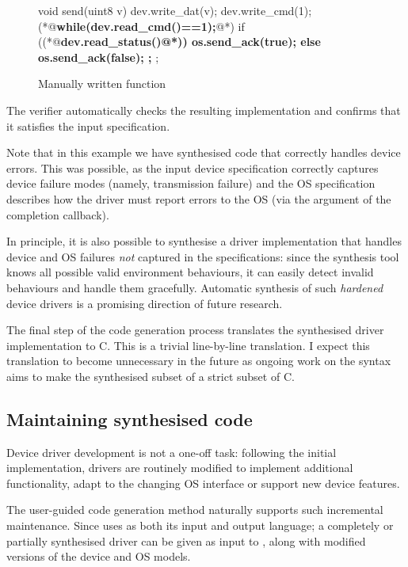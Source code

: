 \begin{figure}
\begin{tsllisting}
void send(uint8 v){
    dev.write_dat(v);
    dev.write_cmd(1);
    (*@{\bf\ttfamily while(dev.read\_cmd()==1){};}@*)
    if ((*@\bf\ttfamily dev.read\_status()@*)) {
        os.send_ack(true);
    } else {
        os.send_ack(false);
    };
};
\end{tsllisting}
\caption{Manually written  function}
\label{f:ex_man_send}
\end{figure}

The verifier automatically checks the resulting implementation and confirms that it satisfies the input specification.

Note that in this example we have synthesised code that correctly handles device errors.  This was possible, as the input device specification correctly captures device failure modes (namely, transmission failure) and the OS specification describes how the driver must report errors to the OS (via the  argument of the completion callback).

In principle, it is also possible to synthesise a driver implementation that handles device and OS failures \emph{not} captured in the specifications: since the synthesis tool knows all possible valid environment behaviours, it can easily detect invalid behaviours and handle them gracefully.  Automatic synthesis of such \emph{hardened} device drivers is a promising direction of future research.

The final step of the code generation process translates the synthesised driver implementation to C.  This is a trivial line-by-line translation. I expect this translation to become unnecessary in the future as ongoing work on the \tsl syntax aims to make the synthesised subset of \tsl a strict subset of C.

\subsection{Maintaining synthesised code~~} 
Device driver development is not a one-off task: following the initial implementation, drivers are routinely modified to implement additional functionality, adapt to the changing OS interface or support new device features.

The user-guided code generation method naturally supports such incremental maintenance. Since \termite uses \tsl as both its input and output language;  a completely or partially synthesised driver can be given as input to \termite, along with modified versions of the device and OS models.

